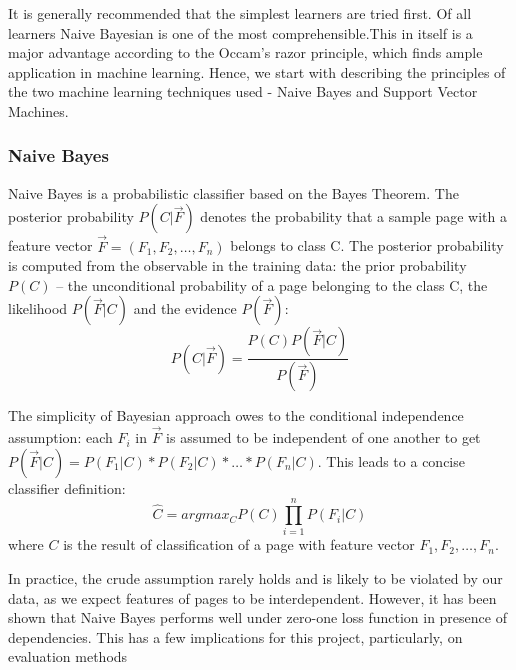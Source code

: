 \documentclass[11pt,twoside,notitlepage]{report}
\begin{document}
It is generally recommended that the simplest learners are tried
first\cite{domingos}. Of all learners Naive Bayesian is one of the most
comprehensible.This in itself is a major advantage according to the Occam's
razor principle, which finds ample application in machine learning.
Hence, we start with describing the principles of the two machine learning
techniques used - Naive Bayes and Support Vector Machines.

\subsubsection*{Naive Bayes}

Naive Bayes is a probabilistic classifier based on the Bayes Theorem. The
posterior probability \(P(C|\vec{F})\) denotes the probability that a sample
page with a feature vector \(\vec{F}=(F_1,F_2,\dots,F_n)\) belongs to class C.
The posterior probability is computed from the observable in the training data: the prior
probability \(P(C)\) -- the unconditional probability of a page belonging to
the class C, the likelihood \(P(\vec{F}|C)\) and the evidence \(P(\vec{F})\):
\begin{equation}
P(C|\vec{F}) = \frac{P(C)P(\vec{F}|C)}{P(\vec{F})}
\end{equation}

The simplicity of Bayesian approach owes to the conditional independence
assumption: each \(F_i\) in \(\vec{F}\) is assumed to be independent of one
another to get \(P(\vec{F}|C)=P(F_1|C)*P(F_2|C)*\dots*P(F_n|C)\). This leads to a concise classifier definition:
\begin{equation}
\hat{C}= argmax_C P(C)\prod_{i=1}^{n}P(F_i|C)
\end{equation}
where \(C\) is the result of classification of a page with feature vector
\(F_1,F_2,\dots,F_n\).

In practice, the crude assumption rarely  holds and is likely to
be violated by our data, as we expect features of pages to be interdependent.
However, it has been shown that Naive Bayes performs well under zero-one loss
function in presence of dependencies\cite{OPTIM}. This has a few
implications for this project, particularly, on evaluation methods 
\end{document}
